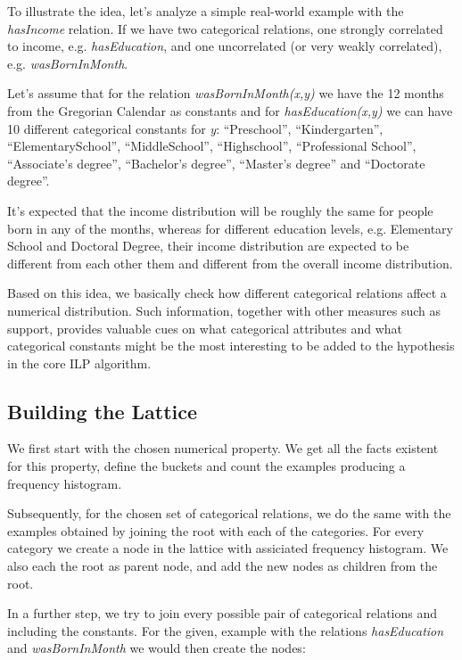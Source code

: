To illustrate the idea, let's analyze a simple real-world example with the \emph{hasIncome} relation. If we have two
categorical relations, one strongly correlated to income, e.g. \emph{hasEducation}, and one uncorrelated (or very weakly
correlated), e.g. \emph{wasBornInMonth}.

Let's assume that for the relation \emph{wasBornInMonth(x,y)} we have the 12 months from the Gregorian Calendar as
constants and for \emph{hasEducation(x,y)} we can have 10 different categorical constants for \emph{y}: ``Preschool'',
``Kindergarten'', ``ElementarySchool'', ``MiddleSchool'', ``Highschool'', ``Professional School'', ``Associate's
degree'', ``Bachelor's degree'', ``Master's degree'' and ``Doctorate degree''. 

It's expected that the income distribution will be roughly the same for people born in any of the months, whereas
for different education levels, e.g. Elementary School and Doctoral Degree, their income distribution are expected to be
different from each other them and different from the overall income distribution.

Based on this idea, we basically check how different categorical relations affect a numerical distribution. Such
information, together with other measures such as support, provides valuable cues on what categorical attributes and
what
categorical constants might be the most interesting to be added to the hypothesis in the core ILP algorithm.

\subsection{Building the Lattice}

We first start with the chosen numerical property. We get all the facts existent for this property, define the buckets
and count the examples producing a frequency histogram.

Subsequently, for the chosen set of categorical relations, we do the same with the examples obtained by joining the root
with each of the categories. For every category we create a node in the lattice with assiciated frequency histogram. We
also each the root as parent node, and add the new nodes as children from the root.

In a further step, we try to join every possible pair of categorical relations and including the constants. For the
given, example with the relations \emph{hasEducation} and \emph{wasBornInMonth} we would then create the nodes:

